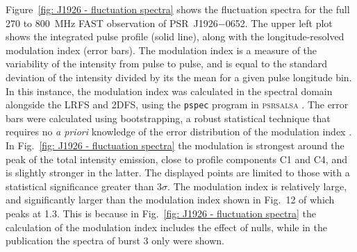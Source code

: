 Figure~\ref{fig: J1926 - fluctuation spectra} shows the fluctuation spectra for the full 270 to 800~MHz FAST observation of PSR~J1926$-$0652. The upper left plot shows the integrated pulse profile (solid line), along with the longitude-resolved modulation index (error bars). The modulation index is a measure of the variability of the intensity from pulse to pulse, and is equal to the standard deviation of the intensity divided by its the mean for a given pulse longitude bin. In this instance, the modulation index was calculated in the spectral domain alongside the LRFS and 2DFS, using the \texttt{pspec} program in \textsc{psrsalsa} \citep{Wxxx2016}. The error bars were calculated using bootstrapping, a robust statistical technique that requires no \textit{a priori} knowledge of the error distribution of the modulation index \citep[e.g.][]{WJxx2012}. In Fig.~\ref{fig: J1926 - fluctuation spectra} the modulation is strongest around the peak of the total intensity emission, close to profile components C1 and C4, and is slightly stronger in the latter. The displayed points are limited to those with a statistical significance greater than $3\sigma$. The modulation index is relatively large, and significantly larger than the modulation index shown in Fig.~12 of \citet{ZLH+2019} which peaks at 1.3. This is because in Fig.~\ref{fig: J1926 - fluctuation spectra} the calculation of the modulation index includes the effect of nulls, while in the publication the spectra of burst 3 only were shown.


